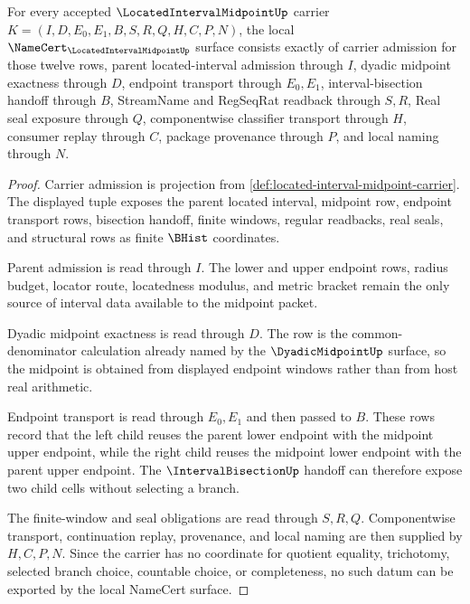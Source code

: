 \begin{theorem}
\label{thm:located-interval-midpoint-namecert-obligations}
For every accepted $\LocatedIntervalMidpointUp$ carrier $K=(I,D,E_0,E_1,B,S,R,Q,H,C,P,N)$, the local $\NameCert_{\LocatedIntervalMidpointUp}$ surface consists exactly of carrier admission for those twelve rows, parent located-interval admission through $I$, dyadic midpoint exactness through $D$, endpoint transport through $E_0,E_1$, interval-bisection handoff through $B$, StreamName and RegSeqRat readback through $S,R$, Real seal exposure through $Q$, componentwise classifier transport through $H$, consumer replay through $C$, package provenance through $P$, and local naming through $N$.
\end{theorem}
\begin{proof}
Carrier admission is projection from \autoref{def:located-interval-midpoint-carrier}. The displayed tuple exposes the parent located interval, midpoint row, endpoint transport rows, bisection handoff, finite windows, regular readbacks, real seals, and structural rows as finite $\BHist$ coordinates.

Parent admission is read through $I$. The lower and upper endpoint rows, radius budget, locator route, locatedness modulus, and metric bracket remain the only source of interval data available to the midpoint packet.

Dyadic midpoint exactness is read through $D$. The row is the common-denominator calculation already named by the $\DyadicMidpointUp$ surface, so the midpoint is obtained from displayed endpoint windows rather than from host real arithmetic.

Endpoint transport is read through $E_0,E_1$ and then passed to $B$. These rows record that the left child reuses the parent lower endpoint with the midpoint upper endpoint, while the right child reuses the midpoint lower endpoint with the parent upper endpoint. The $\IntervalBisectionUp$ handoff can therefore expose two child cells without selecting a branch.

The finite-window and seal obligations are read through $S,R,Q$. Componentwise transport, continuation replay, provenance, and local naming are then supplied by $H,C,P,N$. Since the carrier has no coordinate for quotient equality, trichotomy, selected branch choice, countable choice, or completeness, no such datum can be exported by the local NameCert surface.
\end{proof}

